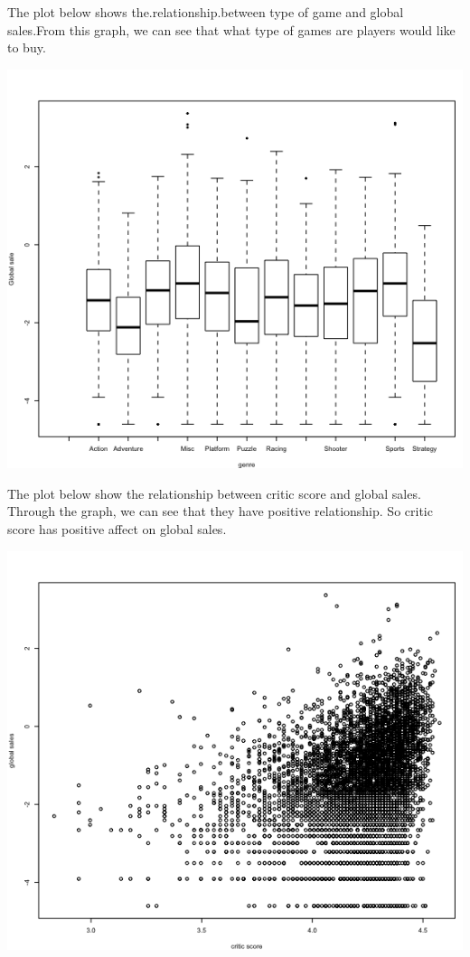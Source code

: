 \documentclass{article}
\begin{document}
The plot below shows the.relationship.between type of game and global sales.From this graph, we can see that what type of games are players would like to buy.


\includegraphics[scale=0.5]{PS6b_wu.png}


The plot below show the relationship between critic score and global sales. Through the graph, we can see that they have positive relationship. So critic score has positive affect on global sales.


\includegraphics[scale=0.5]{PS6c_wu.png}
\end{document}
